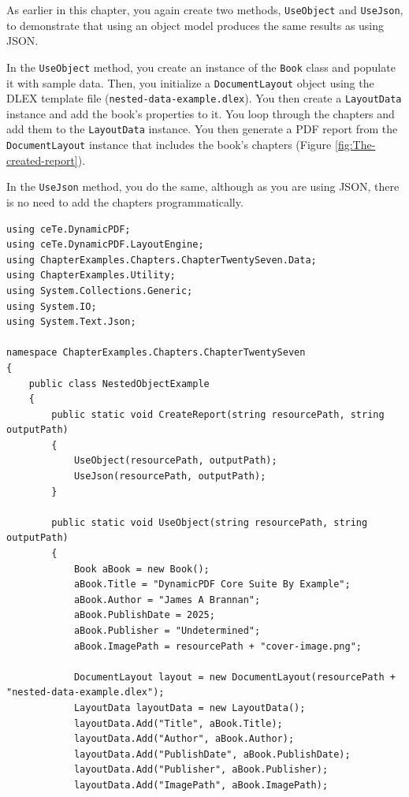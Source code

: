 \documentclass[american,letterpaper]{tufte-book}
\numberwithin{equation}{section}
\numberwithin{figure}{section}
\begin{document}
{{As earlier in this chapter, you again create two methods, \texttt{UseObject}
and \texttt{UseJson}, to demonstrate that using an object model produces
the same results as using JSON. 

In the \texttt{UseObject} method, you create an instance of the \texttt{Book}
class and populate it with sample data. Then, you initialize a \texttt{DocumentLayout}
object using the DLEX template file (\texttt{nested-data-example.dlex}).
You then create a \texttt{LayoutData} instance and add the book's
properties to it. You loop through the chapters and add them to the
\texttt{LayoutData} instance. You then generate a PDF report from
the \texttt{DocumentLayout} instance that includes the book's chapters
(Figure \ref{fig:The-created-report}). 

In the \texttt{UseJson} method, you do the same, although as you are
using JSON, there is no need to add the chapters programmatically.

\bgroup{}
\begin{lstlisting}[caption={Creating a book report with chapters.},label={lis:Creating-a-book},basicstyle={\small\ttfamily},breaklines=true]
using ceTe.DynamicPDF;
using ceTe.DynamicPDF.LayoutEngine;
using ChapterExamples.Chapters.ChapterTwentySeven.Data;
using ChapterExamples.Utility;
using System.Collections.Generic;
using System.IO;
using System.Text.Json;

namespace ChapterExamples.Chapters.ChapterTwentySeven
{
    public class NestedObjectExample
    {
        public static void CreateReport(string resourcePath, string outputPath)
        {
            UseObject(resourcePath, outputPath);
            UseJson(resourcePath, outputPath);
        }

        public static void UseObject(string resourcePath, string outputPath)
        {
            Book aBook = new Book();
            aBook.Title = "DynamicPDF Core Suite By Example";
            aBook.Author = "James A Brannan";
            aBook.PublishDate = 2025;
            aBook.Publisher = "Undetermined";
            aBook.ImagePath = resourcePath + "cover-image.png";

            DocumentLayout layout = new DocumentLayout(resourcePath + "nested-data-example.dlex");
            LayoutData layoutData = new LayoutData();
            layoutData.Add("Title", aBook.Title);
            layoutData.Add("Author", aBook.Author);
            layoutData.Add("PublishDate", aBook.PublishDate);
            layoutData.Add("Publisher", aBook.Publisher);
            layoutData.Add("ImagePath", aBook.ImagePath);


\end{lstlisting}}}
\end{document}
